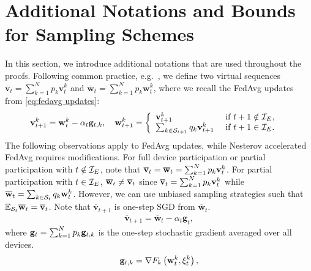 
\section{Additional Notations and Bounds for Sampling Schemes}
\label{sec:app:notations}
In this section, we introduce additional notations that are used throughout
the proofs. Following common practice, e.g.~\cite{stich2018local,li2019convergence}, we define two virtual sequences $\overline{\mathbf{v}}_{t}=\sum_{k=1}^{N} p_{k} \mathbf{v}_{t}^{k}$ and $\overline{\mathbf{w}}_{t}=\sum_{k=1}^{N} p_{k} \mathbf{w}_{t}^{k}$, where we recall the FedAvg updates from \eqref{eq:fedavg updates}:
\begin{align*}
{\mathbf{v}}_{t+1}^{k} & ={\mathbf{w}}_{t}^{k}-\alpha_{t}{\mathbf{g}}_{t,k}, \hspace{1em}
\mathbf{w}_{t+1}^{k} =\left\{
\begin{array}{ll}
\mathbf{v}_{t+1}^{k} & \text { if } t+1 \notin \mathcal{I}_{E}, \\ 
\sum_{k \in {\mathcal{S}}_{t+1}} q_k \mathbf{v}_{t+1}^{k} & \text { if } t+1 \in \mathcal{I}_{E}.
\end{array}\right.
\end{align*}
The following observations apply to FedAvg updates, while Nesterov accelerated FedAvg requires modifications. For full device participation or partial participation with $t \notin {\mathcal{I}}_E$, note that
${\overline{\mathbf{v}}}_t = {\overline{\mathbf{w}}}_t =\sum_{k=1}^{N} p_{k} \mathbf{v}_{t}^{k}$. For partial participation with $t \in {\mathcal{I}}_E$, ${\overline{\mathbf{w}}}_t \neq {\overline{\mathbf{v}}}_t$ since ${\overline{\mathbf{v}}}_t=\sum_{k=1}^{N} p_{k} \mathbf{v}_{t}^{k}$ while ${\overline{\mathbf{w}}}_t=\sum_{k\in {\mathcal{S}}_t}q_k\mathbf{w}_{t}^{k}$. However, we can
use unbiased sampling strategies such that $ \mathbb{E}_{{\mathcal{S}}_t} {\overline{\mathbf{w}}}_t = {\overline{\mathbf{v}}}_t$.
Note that $\overline{\mathbf{v}}_{t+1}$ is one-step SGD from $\overline{\mathbf{w}}_{t}$. 
\begin{align}
\overline{\mathbf{v}}_{t+1}=\overline{\mathbf{w}}_{t}-\alpha_{t} \mathbf{g}_{t},	\label{eq:vbar}
\end{align}
where ${\mathbf{g}}_{t} = \sum_{k=1}^{N} p_{k} {\mathbf{g}}_{t,k} $ is the one-step stochastic gradient averaged over all devices. 
\begin{align*}
{\mathbf{g}}_{t,k} = \nabla F_{k}\left(\mathbf{w}_{t}^{k},\mathbf{\xi}_{t}^{k} \right),   
\end{align*}
